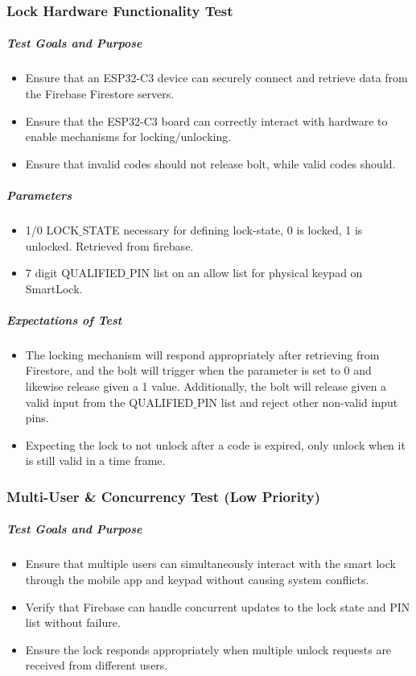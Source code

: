 \documentclass[a4paper,12pt]{article}
\begin{document}
\subsubsection{Lock Hardware Functionality Test}
\subparagraph{Test Goals and Purpose}
\begin{itemize}
    \item Ensure that an ESP32-C3 device can securely connect and retrieve data from the Firebase Firestore servers.
    \item Ensure that the ESP32-C3 board can correctly interact with hardware to enable mechanisms for locking/unlocking.
    \item Ensure that invalid codes should not release bolt, while valid codes should.
\end{itemize}


\subparagraph{Parameters}
\begin{itemize}
    \item 1/0 LOCK$\_$STATE necessary for defining lock-state, 0 is locked, 1 is unlocked. Retrieved from firebase.
    \item 7 digit QUALIFIED$\_$PIN list on an allow list for physical keypad on SmartLock.
\end{itemize}

\subparagraph{Expectations of Test}
\begin{itemize}
    \item The locking mechanism will respond appropriately after retrieving from Firestore, and the bolt will trigger when the parameter is set to 0 and likewise release given a 1 value. Additionally, the bolt will release given a valid input from the QUALIFIED$\_$PIN list and reject other non-valid input pins.
    \item Expecting the lock to not unlock after a code is expired, only unlock when it is still valid in a time frame.
\end{itemize}

\subsubsection{Multi-User \& Concurrency Test (Low Priority)}
\subparagraph{Test Goals and Purpose}
\begin{itemize}
    \item Ensure that multiple users can simultaneously interact with the smart lock through the mobile app and keypad without causing system conflicts.
    \item Verify that Firebase can handle concurrent updates to the lock state and PIN list without failure.
    \item Ensure the lock responds appropriately when multiple unlock requests are received from different users.
\end{itemize}
\end{document}
